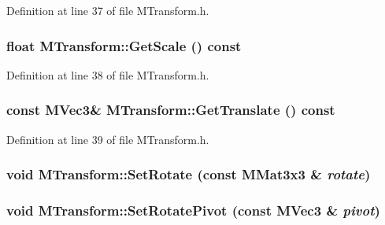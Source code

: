 Definition at line 37 of file MTransform.h.\hypertarget{class_m_transform_89bb1d5f72e0173f89592f635faf4f3a}{
\subsubsection[{GetScale}]{\setlength{\rightskip}{0pt plus 5cm}float MTransform::GetScale () const}}
\label{class_m_transform_89bb1d5f72e0173f89592f635faf4f3a}




Definition at line 38 of file MTransform.h.\hypertarget{class_m_transform_21c3104d078729bfb76802128112c0d5}{
\subsubsection[{GetTranslate}]{\setlength{\rightskip}{0pt plus 5cm}const {\bf MVec3}\& MTransform::GetTranslate () const}}
\label{class_m_transform_21c3104d078729bfb76802128112c0d5}




Definition at line 39 of file MTransform.h.\hypertarget{class_m_transform_a56f36653e8601d3a42a03b661ec161d}{
\subsubsection[{SetRotate}]{\setlength{\rightskip}{0pt plus 5cm}void MTransform::SetRotate (const {\bf MMat3x3} \& {\em rotate})}}
\label{class_m_transform_a56f36653e8601d3a42a03b661ec161d}


\hypertarget{class_m_transform_4f347dd6c167f29787ddc340d4a96473}{
\subsubsection[{SetRotatePivot}]{\setlength{\rightskip}{0pt plus 5cm}void MTransform::SetRotatePivot (const {\bf MVec3} \& {\em pivot})}}
\label{class_m_transform_4f347dd6c167f29787ddc340d4a96473}


